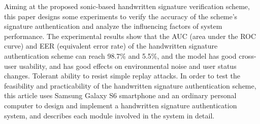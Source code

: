 \begin{englishabstract}
Aiming at the proposed sonic-based handwritten signature verification scheme, this paper designs some experiments to verify the accuracy of the scheme's signature authentication and analyze the influencing factors of system performance. The experimental results show that the AUC (area under the ROC curve) and EER (equivalent error rate) of the handwritten signature authentication scheme can reach 98.7\% and 5.5\%, and the model has good cross-user usability, and has good effects on environmental noise and user status changes. Tolerant ability to resist simple replay attacks. In order to test the feasibility and practicability of the handwritten signature authentication scheme, this article uses Samsung Galaxy S6 smartphone and an ordinary personal computer to design and implement a handwritten signature authentication system, and describes each module involved in the system in detail.

\end{englishabstract}

